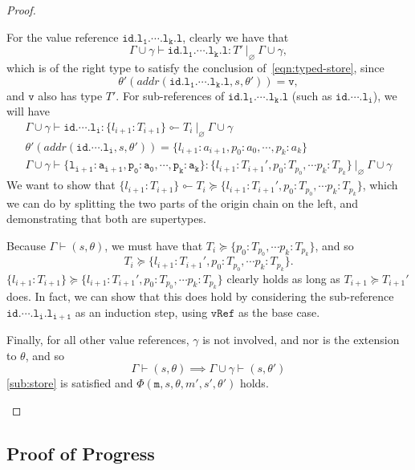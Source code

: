 \documentclass[12pt,a4paper,twoside,openright]{report}
\theoremstyle{definition}
\theoremstyle{dotless}
\newcommand*{\orig}{\ensuremath{\!\multimapinv\!}}
\begin{document}
\begin{proof}
\begin{case}[Assign]
\begin{subcase}[PropAssignType]
		For the value reference $\mathtt{id.l_1.\cdots.l_k.l}$, clearly we have that
		$$\Gamma\!\cup\!\gamma\vdash\mathtt{id.l_1.\cdots.l_k.l}:T'\ |_\varnothing\ \Gamma\!\cup\!\gamma,$$
		which is of the right type to satisfy the conclusion
		of~\eqref{eqn:typed-store}, since
		$$\theta'(addr(\mathtt{id.l_1.\cdots.l_k.l},s, \theta')) = \mathtt{v},$$
		and $\mathtt{v}$ also has type $T'$.
		For sub-references of $\mathtt{id.l_1.\cdots.l_k.l}$ (such as $\mathtt{id.\cdots.l_i}$), we will have
		\begin{gather*}
		  \Gamma\!\cup\!\gamma\vdash\mathtt{id.\cdots.l_i}:\{l_{i+1}:T_{i+1}\}\orig T_i\ |_\varnothing\ \Gamma\!\cup\!\gamma \\
		  \theta'(addr(\mathtt{id.\cdots.l_i},s,\theta'))	= \{l_{i+1}:a_{i+1}, p_0:a_0,\cdots,p_k:a_k\} \\
		  \Gamma\!\cup\!\gamma\vdash\mathtt{\{l_{i+1}:a_{i+1}, p_0:a_0,\cdots,p_k:a_k\}} 
			  :\{l_{i+1}:T_{i+1}', p_0:T_{p_0},\cdots p_k:T_{p_k}\}\ |_\varnothing\ \Gamma\!\cup\!\gamma
	  	\end{gather*}
	  	We want to show that $\{l_{i+1}:T_{i+1}\}\orig T_i\succeq \{l_{i+1}:T_{i+1}', p_0:T_{p_0},\cdots p_k:T_{p_k}\}$, which we can 
		do by splitting the two parts of the origin chain on the left, and demonstrating that both
		are supertypes.

		Because $\Gamma\vdash(s,\theta)$, we must have that $T_i\succeq\{p_0:T_{p_0},\cdots p_k:T_{p_k}\}$, and so 
		$$T_i\succeq\{l_{i+1}:T_{i+1}', p_0:T_{p_0},\cdots p_k:T_{p_k}\}.$$
		$\{l_{i+1}:T_{i+1}\}\succeq \{l_{i+1}:T_{i+1}', p_0:T_{p_0},\cdots p_k:T_{p_k}\}$ clearly
		holds as long as $T_{i+1}\succeq T_{i+1}'$ does. In fact, we can show that this does hold
		by considering the sub-reference $\mathtt{id.\cdots.l_i.l_{i+1}}$ as an induction
		step, using $\mathtt{vRef}$ as the base case.

		Finally, for all other value references, $\gamma$ is not involved, and
		nor is the extension to $\theta$, and so
		$$\Gamma\vdash(s,\theta)\implies\Gamma\!\cup\!\gamma\vdash(s,\theta')$$ 
		\eqref{sub:store} is satisfied and $\Phi(\mathtt{m},s,\theta,m',s',\theta')$ holds.
	  
	  \end{subcase}

  \end{case}
	
\end{proof}

\subsection{Proof of Progress}
\end{document}
